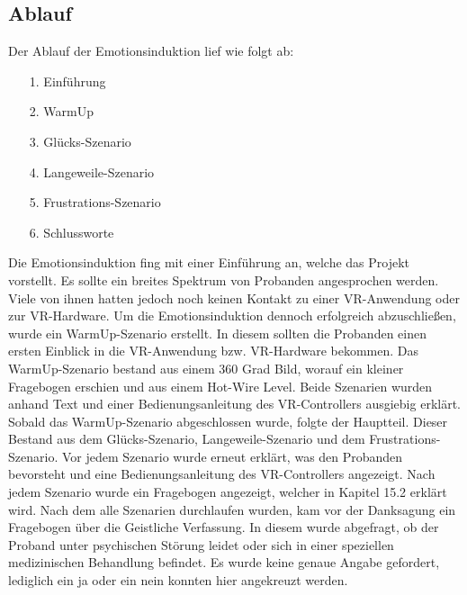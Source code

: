 \subsection{Ablauf} \label{ablauf-subsubsec}




Der Ablauf der Emotionsinduktion lief wie folgt ab:


\begin{itemize}
\item[1.] Einf{\"u}hrung %
\item[2.] WarmUp %
\item[3.] Gl{\"u}cks-Szenario %
\item[4.] Langeweile-Szenario %
\item[5.] Frustrations-Szenario
\item[6.] Schlussworte
\end{itemize}


Die Emotionsinduktion fing mit einer Einf{\"u}hrung an, welche das Projekt vorstellt.
Es sollte ein breites Spektrum von Probanden angesprochen werden. 
Viele von ihnen hatten jedoch noch keinen Kontakt zu einer VR-Anwendung oder zur VR-Hardware. 
Um die Emotionsinduktion dennoch erfolgreich abzuschlie{\ss}en, wurde ein WarmUp-Szenario erstellt. 
In diesem sollten die Probanden einen ersten Einblick in die VR-Anwendung bzw. VR-Hardware bekommen. 
Das WarmUp-Szenario bestand aus einem 360 Grad Bild, worauf ein kleiner Fragebogen erschien und aus einem Hot-Wire Level. 
Beide Szenarien wurden anhand Text und einer Bedienungsanleitung des VR-Controllers ausgiebig erkl{\"a}rt. 
Sobald das WarmUp-Szenario abgeschlossen wurde, folgte der Hauptteil. 
Dieser Bestand aus dem Gl{\"u}cks-Szenario, Langeweile-Szenario und dem Frustrations-Szenario. 
Vor jedem Szenario wurde erneut erkl{\"a}rt, was den Probanden bevorsteht und eine Bedienungsanleitung des VR-Controllers angezeigt. 
Nach jedem Szenario wurde ein Fragebogen angezeigt, welcher in Kapitel 15.2 erkl{\"a}rt wird. 
Nach dem alle Szenarien durchlaufen wurden, kam vor der Danksagung ein Fragebogen {\"u}ber die Geistliche Verfassung. 
In diesem wurde abgefragt, ob der Proband unter psychischen St{\"o}rung leidet oder sich in einer speziellen medizinischen Behandlung befindet. 
Es wurde keine genaue Angabe gefordert, lediglich ein ja oder ein nein konnten hier angekreuzt werden. 

